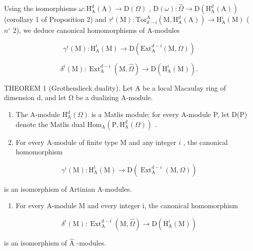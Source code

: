 Using the isomorphisms \(\omega : \mathrm{H}_{\mathrm{A}}^{d}(\mathrm{A}) \to \mathrm{D}(\Omega)\) , \(\mathrm{D}(\omega) : \widehat{\Omega} \to \mathrm{D}(\mathrm{H}_{\mathrm{A}}^{d}(\mathrm{A}))\) (corollary 1 of Proposition 2) and \(\tau^{i}(\mathrm{M}) : \mathrm{Tor}_{d-i}^{\mathrm{A}}(\mathrm{M}, \mathrm{H}_{\mathrm{A}}^{d}(\mathrm{A})) \longrightarrow \mathrm{H}_{\mathrm{A}}^{i}(\mathrm{M})\) ( \(n^{\circ}\) 2), we deduce canonical homomorphisms of A-modules

\[
\gamma^ {i} (\mathrm{M}): \mathrm{H} _ {\mathrm{A}} ^ {i} (\mathrm{M}) \longrightarrow \mathrm{D} \left(\mathrm{Ext} _ {\mathrm{A}} ^ {d - i} (\mathrm{M}, \Omega)\right)
\]

\[
\delta^ {i} (\mathrm{M}): \operatorname{Ext} _ {\mathrm{A}} ^ {d - i} (\mathrm{M}, \widehat {\Omega}) \longrightarrow \mathrm{D} \left(\mathrm{H} _ {\mathrm{A}} ^ {i} (\mathrm{M})\right).
\]

THEOREM 1 (Grothendieck duality). Let A be a local Macaulay ring of dimension d, and let Ω be a dualizing A-module.

\begin{enumerate}
\def\labelenumi{\alph{enumi})}
\item
  The A-module \(\mathrm{H}_{\mathrm{A}}^{d}(\Omega)\) is a Matlis module; for every A-module P, let D(P) denote the Matlis dual \(\mathrm{Hom}_{\mathrm{A}}(\mathrm{P},\mathrm{H}_{\mathrm{A}}^{d}(\Omega))\) .
\item
  For every \(\mathrm{A}\)-module of finite type M and any integer \(i\) , the canonical homomorphism
\end{enumerate}

\[
\gamma^ {i} (\mathrm{M}): \mathrm{H} _ {\mathrm{A}} ^ {i} (\mathrm{M}) \longrightarrow \mathrm{D} \left(\operatorname{Ext} _ {\mathrm{A}} ^ {d - i} (\mathrm{M}, \Omega)\right)
\]

is an isomorphism of Artinian A-modules.

\begin{enumerate}
\def\labelenumi{\alph{enumi})}
\setcounter{enumi}{2}
\tightlist
\item
  For every A-module M and every integer i, the canonical homomorphism
\end{enumerate}

\[
\delta^ {i} (\mathrm{M}): \operatorname{Ext} _ {\mathrm{A}} ^ {d - i} (\mathrm{M}, \widehat {\Omega}) \longrightarrow \mathrm{D} \left(\mathrm{H} _ {\mathrm{A}} ^ {i} (\mathrm{M})\right)
\]

is an isomorphism of \(\widehat{\mathrm{A}}\) -modules.


